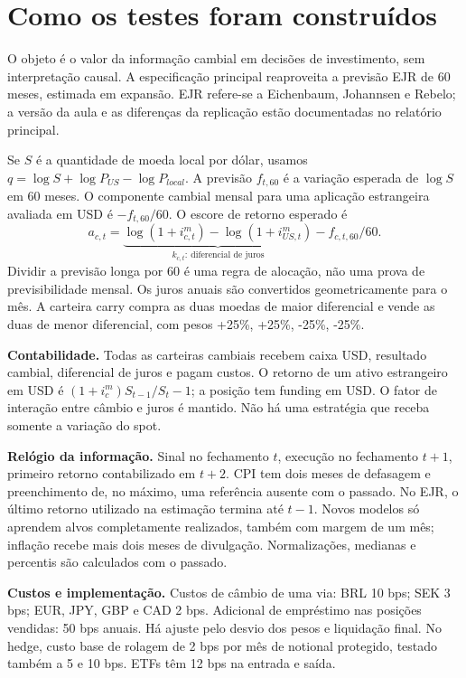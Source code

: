 \documentclass[11pt,a4paper]{article}
\begin{document}
\clearpage

\section*{Como os testes foram construídos}
O objeto é o valor da informação cambial em decisões de investimento, sem interpretação causal. A especificação principal reaproveita a previsão EJR de 60 meses, estimada em expansão. EJR refere-se a Eichenbaum, Johannsen e Rebelo; a versão da aula e as diferenças da replicação estão documentadas no relatório principal.

Se $S$ é a quantidade de moeda local por dólar, usamos $q=\log S+\log P_{US}-\log P_{local}$. A previsão $f_{t,60}$ é a variação esperada de $\log S$ em 60 meses. O componente cambial mensal para uma aplicação estrangeira avaliada em USD é $-f_{t,60}/60$. O escore de retorno esperado é
\[ a_{c,t}=\underbrace{\log(1+i^m_{c,t})-\log(1+i^m_{US,t})}_{k_{c,t}:\ \text{diferencial de juros}}-f_{c,t,60}/60. \]
Dividir a previsão longa por 60 é uma regra de alocação, não uma prova de previsibilidade mensal. Os juros anuais são convertidos geometricamente para o mês. A carteira carry compra as duas moedas de maior diferencial e vende as duas de menor diferencial, com pesos +25\%, +25\%, -25\%, -25\%.

\textbf{Contabilidade.} Todas as carteiras cambiais recebem caixa USD, resultado cambial, diferencial de juros e pagam custos. O retorno de um ativo estrangeiro em USD é $(1+i^m_c)S_{t-1}/S_t-1$; a posição tem funding em USD. O fator de interação entre câmbio e juros é mantido. Não há uma estratégia que receba somente a variação do spot.

\textbf{Relógio da informação.} Sinal no fechamento $t$, execução no fechamento $t+1$, primeiro retorno contabilizado em $t+2$. CPI tem dois meses de defasagem e preenchimento de, no máximo, uma referência ausente com o passado. No EJR, o último retorno utilizado na estimação termina até $t-1$. Novos modelos só aprendem alvos completamente realizados, também com margem de um mês; inflação recebe mais dois meses de divulgação. Normalizações, medianas e percentis são calculados com o passado.

\textbf{Custos e implementação.} Custos de câmbio de uma via: BRL 10 bps; SEK 3 bps; EUR, JPY, GBP e CAD 2 bps. Adicional de empréstimo nas posições vendidas: 50 bps anuais. Há ajuste pelo desvio dos pesos e liquidação final. No hedge, custo base de rolagem de 2 bps por mês de notional protegido, testado também a 5 e 10 bps. ETFs têm 12 bps na entrada e saída.
\end{document}
